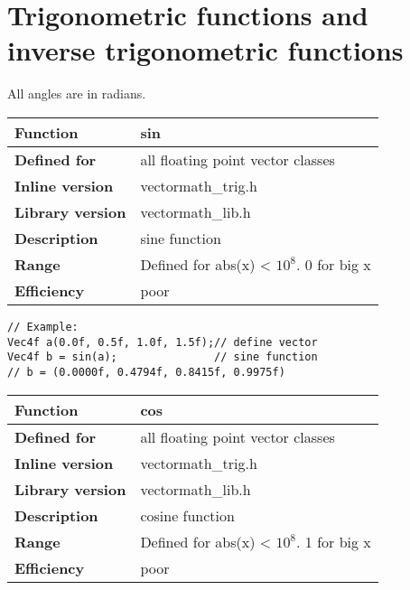 \documentclass[vcl_manual.tex]{subfiles}
\begin{document}



\section{Trigonometric functions and inverse trigonometric functions}
All angles are in radians.


\begin{tabular}{|p{30mm}|p{120mm}|}
\hline
\bfseries Function & sin \\ \hline
\bfseries Defined for & all floating point vector classes \\ \hline
\bfseries Inline version & vectormath\_trig.h \\ \hline
\bfseries Library version & vectormath\_lib.h \\ \hline
\bfseries Description & sine function \\ \hline
\bfseries Range & Defined for abs(x) \textless{} $10^8$. 0 for big x \\ \hline
\bfseries Efficiency & poor \\ \hline
\end{tabular}
\begin{lstlisting}[frame=none]
// Example:
Vec4f a(0.0f, 0.5f, 1.0f, 1.5f);// define vector
Vec4f b = sin(a);               // sine function
// b = (0.0000f, 0.4794f, 0.8415f, 0.9975f)
\end{lstlisting}


\begin{tabular}{|p{30mm}|p{120mm}|}
\hline
\bfseries Function & cos \\ \hline
\bfseries Defined for & all floating point vector classes \\ \hline
\bfseries Inline version & vectormath\_trig.h \\ \hline
\bfseries Library version & vectormath\_lib.h \\ \hline
\bfseries Description & cosine function \\ \hline
\bfseries Range & Defined for abs(x) \textless{} $10^8$. 1 for big x \\ \hline
\bfseries Efficiency & poor \\ \hline
\end{tabular}
\end{document}
